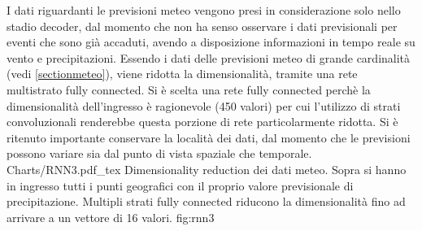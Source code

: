 I dati riguardanti le previsioni meteo vengono presi in considerazione solo nello stadio decoder, dal momento che non ha senso osservare i dati previsionali per eventi che sono già accaduti, avendo a disposizione informazioni in tempo reale su vento e precipitazioni. Essendo i dati delle previsioni meteo di grande cardinalità (vedi  \ref{sectionmeteo}), viene ridotta la dimensionalità, tramite una rete multistrato fully connected. Si è scelta una rete fully connected perchè la dimensionalità dell'ingresso è ragionevole (450 valori) per cui l'utilizzo di strati convoluzionali renderebbe questa porzione di rete particolarmente ridotta. Si è ritenuto importante conservare la località dei dati, dal momento che le previsioni possono variare sia dal punto di vista spaziale che temporale.
\svg
{Charts/RNN3.pdf_tex}
{Dimensionality reduction dei dati meteo. Sopra si hanno in ingresso tutti i punti geografici con il proprio valore previsionale di precipitazione. Multipli strati fully connected riducono la dimensionalità fino ad arrivare a un vettore di 16 valori.}
{fig:rnn3}

